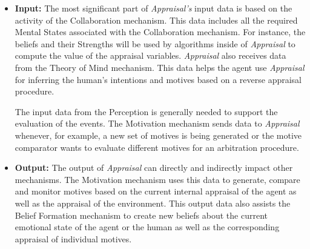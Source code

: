\documentclass[12pt]{report}
\begin{document}
\begin{itemize}
  \item \textbf{Input:} The most significant part of \textit{Appraisal's} input
  data is based on the activity of the Collaboration mechanism. This data
  includes all the required Mental States associated with the Collaboration
  mechanism. For instance, the beliefs and their Strengths will be used by
  algorithms inside of \textit{Appraisal} to compute the value of the appraisal
  variables. \textit{Appraisal} also receives data from the Theory of Mind
  mechanism. This data helps the agent use \textit{Appraisal} for inferring
  the human's intentions and motives based on a reverse appraisal procedure.
  
  The input data from the Perception is generally needed to support the
  evaluation of the events. The Motivation mechanism sends data to
  \textit{Appraisal} whenever, for example, a new set of motives is being
  generated or the motive comparator wants to evaluate different motives for an
  arbitration procedure.
   
  \item \textbf{Output:} The output of \textit{Appraisal} can directly and
  indirectly impact other mechanisms. The Motivation mechanism uses this data to
  generate, compare and monitor motives based on the current internal appraisal
  of the agent as well as the appraisal of the environment. This output data
  also assists the Belief Formation mechanism to create new beliefs about the
  current emotional state of the agent or the human as well as the corresponding
  appraisal of individual motives.
  

\end{itemize}
\end{document}
